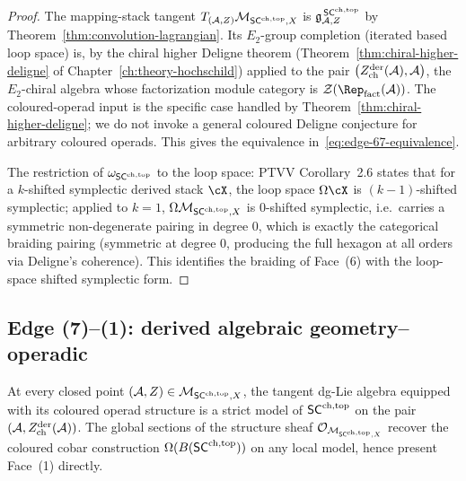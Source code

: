\begin{proof}
The mapping-stack tangent $T_{(\mathcal{A},Z)}\mathcal{M}_{\mathsf{SC}^{\mathrm{ch},\mathrm{top}},X}$ is
$\mathfrak{g}^{\,\mathsf{SC}^{\mathrm{ch},\mathrm{top}}}_{\mathcal{A},Z}$ by
Theorem~\ref{thm:convolution-lagrangian}. Its $E_2$-group
completion (iterated based loop space) is, by the chiral higher
Deligne theorem (Theorem~\ref{thm:chiral-higher-deligne} of
Chapter~\ref{ch:theory-hochschild}) applied to the pair
$\bigl(Z^{\mathrm{der}}_{\mathrm{ch}}(\mathcal{A}),\mathcal{A}\bigr)$, the
$E_2$-chiral algebra whose factorization module category is
$\cZ(\Rep_{\mathrm{fact}}(\cA))$. The coloured-operad input
is the specific case handled by Theorem~\ref{thm:chiral-higher-deligne};
we do not invoke a general coloured Deligne conjecture for
arbitrary coloured operads. This gives the equivalence
in~\eqref{eq:edge-67-equivalence}.

The restriction of $\omega_{\mathsf{SC}^{\mathrm{ch},\mathrm{top}}}$ to the loop space:
PTVV Corollary~2.6 states that for a $k$-shifted symplectic derived
stack $\cX$, the loop space $\Omega\cX$ is $(k-1)$-shifted
symplectic; applied to $k=1$, $\Omega\mathcal{M}_{\mathsf{SC}^{\mathrm{ch},\mathrm{top}},X}$ is
$0$-shifted symplectic, i.e.\ carries a symmetric non-degenerate
pairing in degree $0$, which is exactly the categorical braiding
pairing (symmetric at degree $0$, producing the full hexagon at
all orders via Deligne's coherence). This identifies the braiding
of Face~(6) with the loop-space shifted symplectic form.
\end{proof}

\subsection{Edge (7)--(1): derived algebraic geometry--operadic}\label{subsec:edge-71}

\begin{theorem}\label{thm:edge-71}%
At every closed point $(\mathcal{A},Z)\in\mathcal{M}_{\mathsf{SC}^{\mathrm{ch},\mathrm{top}},X}$, the
tangent dg-Lie algebra equipped with its coloured operad structure
is a strict model of $\mathsf{SC}^{\mathrm{ch},\mathrm{top}}$ on the pair
$(\mathcal{A},Z^{\mathrm{der}}_{\mathrm{ch}}(\mathcal{A}))$. The global
sections of the structure sheaf
$\mathcal{O}_{\mathcal{M}_{\mathsf{SC}^{\mathrm{ch},\mathrm{top}},X}}$ recover the coloured cobar
construction $\Omega(B(\mathsf{SC}^{\mathrm{ch},\mathrm{top}}))$ on any local model, hence present
Face~(1) directly.
\end{theorem}

